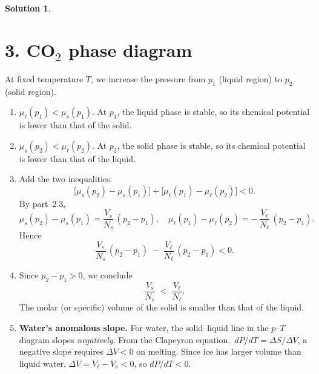 \documentclass[12pt]{article}
\theoremstyle{definition} %
\newtheorem{solution}{Solution}
\theoremstyle{plain} %
\begin{document}
\begin{solution}
  \section*{3. CO\(_2\) phase diagram}

  At fixed temperature \(T\), we increase the pressure from \(p_1\) (liquid region) to \(p_2\) (solid region).
  
  \begin{enumerate}[label=(\alph*)]
    \item \(\mu_{\ell}(p_{1}) < \mu_{s}(p_{1})\).  
      At \(p_{1}\), the liquid phase is stable, so its chemical potential is lower than that of the solid.
    
    \item \(\mu_{s}(p_{2}) < \mu_{\ell}(p_{2})\).  
      At \(p_{2}\), the solid phase is stable, so its chemical potential is lower than that of the liquid.
    
    \item Add the two inequalities:
      \[
        \bigl[\mu_{s}(p_{2}) - \mu_{s}(p_{1})\bigr]
        + \bigl[\mu_{\ell}(p_{1}) - \mu_{\ell}(p_{2})\bigr]
        < 0.
      \]
      By part 2.3,
      \[
        \mu_{s}(p_{2}) - \mu_{s}(p_{1})
        = \frac{V_{s}}{N_{s}}\,(p_{2}-p_{1}),
        \quad
        \mu_{\ell}(p_{1}) - \mu_{\ell}(p_{2})
        = -\,\frac{V_{\ell}}{N_{\ell}}\,(p_{2}-p_{1}).
      \]
      Hence
      \[
        \frac{V_{s}}{N_{s}}\,(p_{2}-p_{1})
        \;-\;\frac{V_{\ell}}{N_{\ell}}\,(p_{2}-p_{1})
        <0.
      \]
    
    \item Since \(p_{2}-p_{1}>0\), we conclude
      \[
        \frac{V_{s}}{N_{s}} \;<\;\frac{V_{\ell}}{N_{\ell}}.
      \]
      The molar (or specific) volume of the solid is smaller than that of the liquid.
    
    \item \textbf{Water’s anomalous slope.}  
      For water, the solid–liquid line in the \(p\)–\(T\) diagram slopes \emph{negatively}.  From the Clapeyron equation,
      \(\,dP/dT = \Delta S/\Delta V\), a negative slope requires \(\Delta V<0\) on melting.  Since ice has larger volume than liquid water, \(\Delta V = V_{\ell}-V_{s}<0\), so \(dP/dT<0\).
  \end{enumerate} 
\end{solution}
\end{document}
